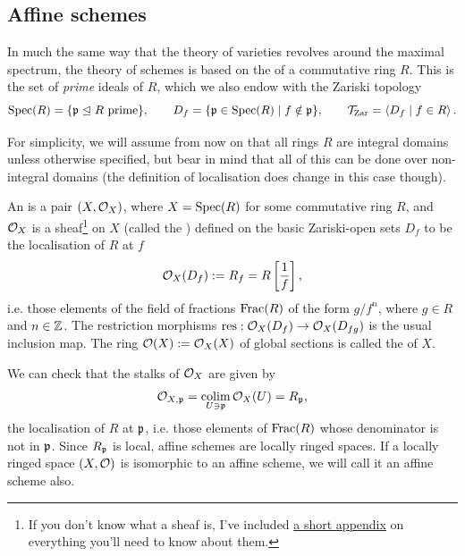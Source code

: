 \subsection{Affine schemes}
\label{subsec:2_2_affine_schemes}
In much the same way that the theory of varieties revolves around the maximal spectrum, the theory of schemes is based on the  of a commutative ring $R$. This is the set of \emph{prime} ideals of $R$, which we also endow with the Zariski topology 
\[
	\mathrm{Spec}(R) = \{\mathfrak{p} \trianglelefteq R \ \text{prime}\}, \qquad D_f = \{\mathfrak{p} \in \mathrm{Spec}(R) \mid f \notin \mathfrak{p}\}, \qquad \mathcal{T}_\text{Zar} = \left\langle D_f \mid f \in R\right\rangle.
\]

For simplicity, we will assume from now on that all rings $R$ are integral domains unless otherwise specified, but bear in mind that all of this can be done over non-integral domains (the definition of localisation does change in this case though).

\begin{defn}
	An  is a pair $(X, \mathcal{O}_X)$, where $X = \mathrm{Spec}(R)$ for some commutative ring $R$, and $\mathcal{O}_X$ is a sheaf\footnote{If you don't know what a sheaf is, I've included \hyperref[appendix:A_sheaves]{a short appendix} on everything you'll need to know about them.} on $X$ (called the ) defined on the basic Zariski-open sets $D_f$ to be the localisation of $R$ at $f$
	\[
		\mathcal{O}_X (D_f) := R_f = R\left[\frac{1}{f}\right],
	\]
	i.e. those elements of the field of fractions $\mathrm{Frac}(R)$ of the form $g / f^n$, where $g \in R$ and $n \in \mathbb{Z}$. The restriction morphisms $\mathrm{res}:\mathcal{O}_X(D_f) \to \mathcal{O}_X(D_{fg})$ is the usual inclusion map. The ring $\mathcal{O}(X) := \mathcal{O}_X(X)$ of global sections is called the  of $X$.
\end{defn}

We can check that the stalks of $\mathcal{O}_X$ are given by
\[
	\mathcal{O}_{X, \mathfrak{p}} = \mathop{\mathrm{colim}}\limits_{U \ni \mathfrak{p}} \mathcal{O}_X(U) = R_{\mathfrak{p}},
\]
the localisation of $R$ at $\mathfrak{p}$, i.e. those elements of $\mathrm{Frac}(R)$ whose denominator is not in $\mathfrak{p}$. Since $R_{\mathfrak{p}}$ is local, affine schemes are locally ringed spaces. If a locally ringed space $(X, \mathcal{O})$ is isomorphic to an affine scheme, we will call it an affine scheme also.\\

